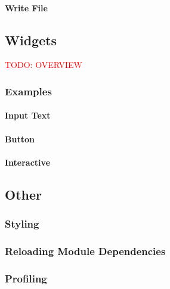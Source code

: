 
\paragraph{Write File}


\subsection{Widgets}

\textcolor{red}{TODO: OVERVIEW}

\subsubsection{Examples}

\paragraph{Input Text}


\paragraph{Button}


\paragraph{Interactive}


\subsection{Other}

\subsubsection{Styling}


\subsubsection{Reloading Module Dependencies}

\subsubsection{Profiling}